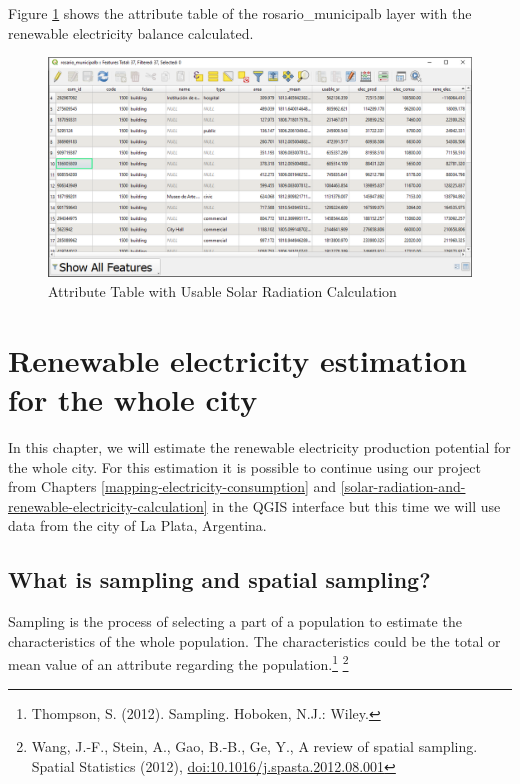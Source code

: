 \documentclass[
]{book}
\begin{document}
Figure \ref{fig:img-196} shows the attribute table of the {rosario\_municipalb} layer with the renewable electricity balance calculated.

\begin{figure}

{\centering \includegraphics[width=1\linewidth]{images/reneelec} 

}

\caption{Attribute Table with Usable Solar Radiation Calculation}\label{fig:img-196}
\end{figure}

\hypertarget{renewable-electricity-estimation-for-the-whole-city}{%
\chapter{Renewable electricity estimation for the whole city}\label{renewable-electricity-estimation-for-the-whole-city}}

In this chapter, we will estimate the renewable electricity production potential for the whole city. For this estimation it is possible to continue using our project from Chapters \ref{mapping-electricity-consumption} and \ref{solar-radiation-and-renewable-electricity-calculation} in the QGIS interface but this time we will use data from the city of La Plata, Argentina.

\hypertarget{what-is-sampling-and-spatial-sampling}{%
\section{What is sampling and spatial sampling?}\label{what-is-sampling-and-spatial-sampling}}

Sampling is the process of selecting a part of a population to estimate the characteristics of the whole population. The characteristics could be the total or mean value of an attribute regarding the population.\footnote{Thompson, S. (2012). Sampling. Hoboken, N.J.: Wiley.} \footnote{Wang, J.-F., Stein, A., Gao, B.-B., Ge, Y., A review of spatial
  sampling. Spatial Statistics (2012), \url{doi:10.1016/j.spasta.2012.08.001}}
\end{document}
